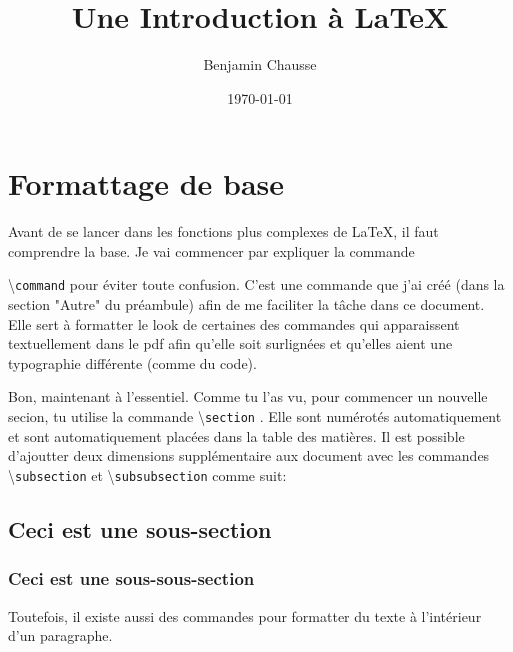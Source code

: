 \documentclass[a4paper, 10pt]{article}
\title{Une Introduction à \LaTeX}
\author{Benjamin Chausse}
\date{\today}
\newcommand{\command}[1]{
	\colorbox{codebackground}{\scriptsize{\textbackslash}\texttt{#1}}
}
\begin{document}
\maketitle


\newpage

\tableofcontents

\newpage

\section{Formattage de base}
Avant de se lancer dans les fonctions plus complexes de \LaTeX, il faut
comprendre la base. Je vai commencer par expliquer la commande
\command{command} pour éviter toute confusion. C'est une commande que j'ai créé
(dans la section "Autre" du préambule) afin de me faciliter la tâche dans ce
document. Elle sert à formatter le look de certaines des commandes qui
apparaissent textuellement dans le pdf afin qu'elle soit surlignées et qu'elles
aient une typographie différente (comme du code).

Bon, maintenant à l'essentiel. Comme tu l'as vu, pour commencer un nouvelle
secion, tu utilise la commande \command{section}. Elle sont numérotés
automatiquement et sont automatiquement placées dans la table des matières.
Il est possible d'ajoutter deux dimensions supplémentaire aux document avec
les commandes \command{subsection} et \command{subsubsection} comme suit:

\subsection{Ceci est une sous-section}
\subsubsection{Ceci est une sous-sous-section}

Toutefois, il existe aussi des commandes pour formatter du texte à l'intérieur
d'un paragraphe.
\end{document}
